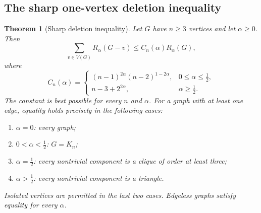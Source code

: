 \documentclass[11pt,a4paper]{article}
\newtheorem{theorem}{Theorem}[section]
\theoremstyle{definition}
\theoremstyle{remark}
\begin{document}
\subsection{The sharp one-vertex deletion inequality}
\label{g-sub-deletion}

\begin{theorem}[Sharp deletion inequality]
\label{g-thm-deletion}
Let $G$ have $n\ge3$ vertices and let $\alpha\ge0$.  Then
\begin{equation}
 \sum_{v\in V(G)}R_\alpha(G-v)
 \le C_n(\alpha)R_\alpha(G),
 \label{g-eq-deletion}
\end{equation}
where
\begin{equation}
 C_n(\alpha)=
 \begin{cases}
 (n-1)^{2\alpha}(n-2)^{1-2\alpha},&0\le\alpha\le\tfrac12,\\[2pt]
 n-3+2^{2\alpha},&\alpha\ge\tfrac12.
 \end{cases}
 \label{g-eq-deletion-constant}
\end{equation}
The constant is best possible for every $n$ and $\alpha$.  For a graph with
at least one edge, equality holds precisely in the following cases:
\begin{enumerate}
 \item $\alpha=0$: every graph;
 \item $0<\alpha<\tfrac12$: $G=K_n$;
 \item $\alpha=\tfrac12$: every nontrivial component is a clique of order
 at least three;
 \item $\alpha>\tfrac12$: every nontrivial component is a triangle.
\end{enumerate}
Isolated vertices are permitted in the last two cases.  Edgeless graphs
satisfy equality for every $\alpha$.
\end{theorem}
\end{document}
